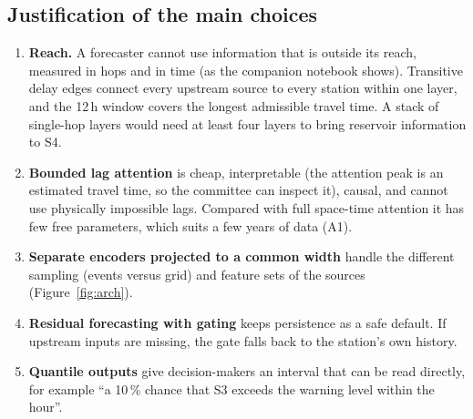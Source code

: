 \subsection*{Justification of the main choices}
\begin{enumerate}[leftmargin=*,itemsep=1pt]
\item \textbf{Reach.} A forecaster cannot use information that is outside its reach, measured in hops
and in time (as the companion notebook shows). Transitive delay edges connect every upstream source
to every station within one layer, and the 12\,h window covers the longest admissible travel time.
A stack of single-hop layers would need at least four layers to bring reservoir information to S4.
\item \textbf{Bounded lag attention} is cheap, interpretable (the attention peak is an estimated
travel time, so the committee can inspect it), causal, and cannot use physically impossible lags.
Compared with full space-time attention it has few free parameters, which suits a few years of
data (A1).
\item \textbf{Separate encoders projected to a common width} handle the different sampling
(events versus grid) and feature sets of the sources (Figure~\ref{fig:arch}).
\item \textbf{Residual forecasting with gating} keeps persistence as a safe default. If upstream
inputs are missing, the gate falls back to the station's own history.
\item \textbf{Quantile outputs} give decision-makers an interval that can be read directly, for
example ``a 10\,\% chance that S3 exceeds the warning level within the hour''.
\end{enumerate}
